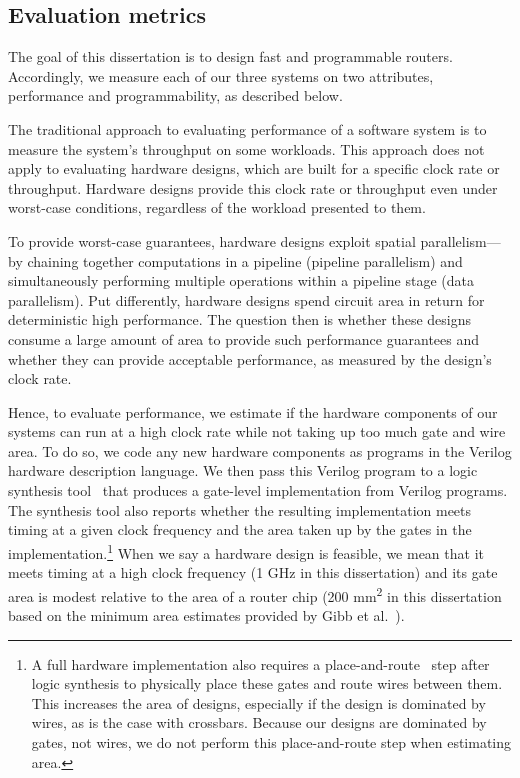 \subsection{Evaluation metrics}
\label{ss:eval_metrics}

The goal of this dissertation is to design fast and programmable routers.
Accordingly, we measure each of our three systems on two attributes,
performance and programmability, as described below.

The traditional approach to evaluating performance of a software system is to
measure the system's throughput on some workloads. This approach does not apply
to evaluating hardware designs, which are built for a specific clock rate or
throughput. Hardware designs provide this clock rate or throughput even under
worst-case conditions, regardless of the workload presented to them.

To provide
worst-case guarantees, hardware designs exploit spatial parallelism---by
chaining together computations in a pipeline (pipeline parallelism) and
simultaneously performing multiple operations within a pipeline stage (data
parallelism).  Put differently, hardware designs spend circuit area in return
for deterministic  high performance. The question then is whether these designs
consume a large amount of area to provide such performance guarantees and
whether they can provide acceptable performance, as measured by the design's clock rate.
 
Hence, to evaluate performance, we estimate if the hardware components of our
systems can run at a high clock rate while not taking up too much gate and wire
area. To do so, we code any new hardware components as programs in the
Verilog hardware description language.  We then pass this Verilog program to a
logic synthesis tool~\cite{synopsys_dc, cadence_rc} that produces a gate-level
implementation from Verilog programs.  The synthesis tool also reports whether
the resulting implementation meets timing at a given clock frequency and the
area taken up by the gates in the implementation.\footnote{A full hardware
implementation also requires a place-and-route~\cite{par} step after logic
synthesis to physically place these gates and route wires between them. This
increases the area of designs, especially if the design is dominated by wires,
as is the case with crossbars. Because our designs are dominated by gates, not
wires, we do not perform this place-and-route step when estimating area.} When
we say a hardware design is feasible, we mean that it meets timing at a high
clock frequency (1 GHz in this dissertation) and its gate area is modest
relative to the area of a router chip (200 \si{\milli\meter\squared} in this
dissertation based on
the minimum area estimates provided by Gibb et al.~\cite{gibb_parsing}). 

